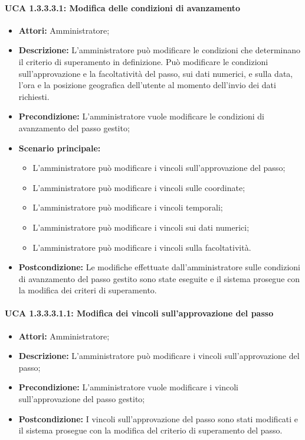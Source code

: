 \paragraph{UCA 1.3.3.3.1: Modifica delle condizioni di avanzamento}
\begin{itemize}
\item \textbf{Attori:}
 Amministratore;
\item \textbf{Descrizione:} 
L'amministratore può modificare le condizioni che determinano il criterio di superamento in definizione.
Può modificare le condizioni sull'approvazione e la facoltatività del passo, sui dati numerici, e sulla data, l'ora e la posizione geografica dell'utente al momento dell'invio dei dati richiesti.
\item \textbf{Precondizione:}
 L'amministratore vuole modificare le condizioni di avanzamento del passo gestito;
\item \textbf{Scenario principale:} 
\begin{itemize}
\item L'amministratore può modificare i vincoli sull'approvazione del passo;
\item L'amministratore può modificare i vincoli sulle coordinate;
\item L'amministratore può modificare i vincoli temporali;
\item L'amministratore può modificare i vincoli sui dati numerici;
\item L'amministratore può modificare i vincoli sulla facoltatività.
\end{itemize}
\item \textbf{Postcondizione:}
 Le modifiche effettuate dall'amministratore sulle condizioni di avanzamento del passo gestito sono state eseguite e il sistema prosegue con la modifica dei criteri di superamento. 
\end{itemize}

\paragraph{UCA 1.3.3.3.1.1: Modifica dei vincoli sull'approvazione del passo}
\begin{itemize}
\item \textbf{Attori:}
 Amministratore;
\item \textbf{Descrizione:} 
L'amministratore può modificare i vincoli sull'approvazione del passo;
\item \textbf{Precondizione:} 
L'amministratore vuole modificare i vincoli sull'approvazione del passo gestito;
\item \textbf{Postcondizione:} 
I vincoli sull'approvazione del passo sono stati modificati e il sistema prosegue con la modifica del criterio di superamento del passo.
\end{itemize}

